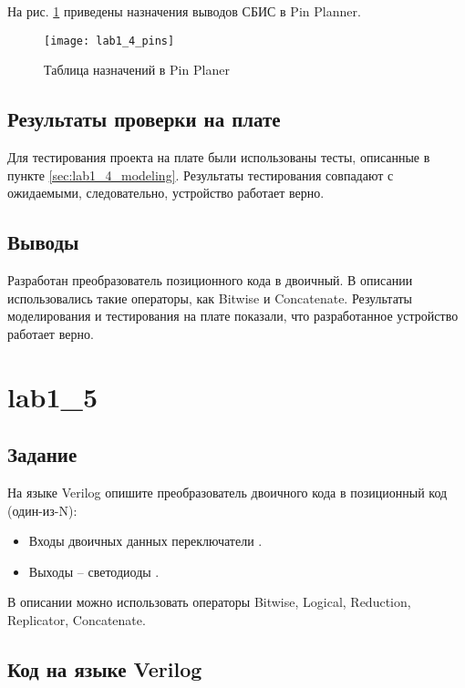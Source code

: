 На рис. \ref{fig:lab1_4_pins} приведены назначения выводов СБИС в Pin Planner.

\begin{figure}[H]
\begin{center}
	\texttt{[image: lab1\_4\_pins]}
	\caption{Таблица назначений в Pin Planer}
	\label{fig:lab1_4_pins}
\end{center}
\end{figure}

\subsection{Результаты проверки на плате}

Для тестирования проекта на плате были использованы тесты, описанные в пункте \ref{sec:lab1_4_modeling}. Результаты тестирования совпадают с ожидаемыми, следовательно, устройство работает верно.

\subsection{Выводы}

Разработан преобразователь позиционного кода в двоичный. В описании использовались такие операторы, как Bitwise и Concatenate. Результаты моделирования и тестирования на плате показали, что разработанное устройство работает верно.

\newpage

\section{lab1\_5}

\subsection{Задание}

На языке Verilog опишите преобразователь двоичного кода в позиционный код (один-из-N):
\begin{itemize}
	\item Входы двоичных данных переключатели .
	\item Выходы – светодиоды .
\end{itemize}
В описании можно использовать операторы Bitwise, Logical, Reduction, Replicator, Concatenate.

\subsection{Код на языке Verilog}

